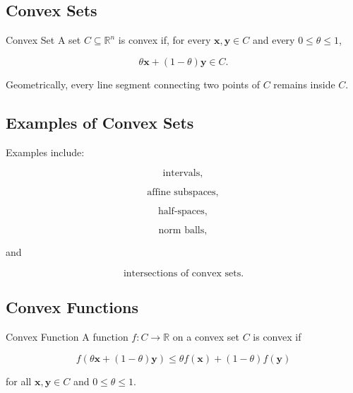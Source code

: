 \subsection{Convex Sets}
\label{subsec:convex-sets-optimization}

\begin{definitionbox}{Convex Set}
A set \(C\subseteq\mathbb{R}^n\) is convex if, for every
\(\mathbf{x},\mathbf{y}\in C\) and every \(0\leq\theta\leq1\),

\[
\boxed{
\theta\mathbf{x}
+
(1-\theta)\mathbf{y}
\in C.
}
\]
\end{definitionbox}

Geometrically, every line segment connecting two points of \(C\) remains
inside \(C\).

\subsection{Examples of Convex Sets}
\label{subsec:examples-convex-sets}

Examples include:

\[
\boxed{
\text{intervals},
}
\]

\[
\boxed{
\text{affine subspaces},
}
\]

\[
\boxed{
\text{half-spaces},
}
\]

\[
\boxed{
\text{norm balls},
}
\]

and

\[
\boxed{
\text{intersections of convex sets}.
}
\]

\subsection{Convex Functions}
\label{subsec:convex-functions-optimization}

\begin{definitionbox}{Convex Function}
A function \(f:C\to\mathbb{R}\) on a convex set \(C\) is convex if

\[
\boxed{
f
(
\theta\mathbf{x}
+
(1-\theta)\mathbf{y}
)
\leq
\theta f(\mathbf{x})
+
(1-\theta)f(\mathbf{y})
}
\]

for all \(\mathbf{x},\mathbf{y}\in C\) and \(0\leq\theta\leq1\).
\end{definitionbox}

